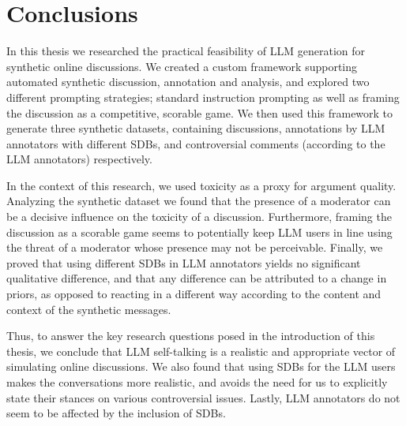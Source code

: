 %
\chapter{Conclusions}
\label{sec:conclusions}

In this thesis we researched the practical feasibility of LLM generation for synthetic online discussions. We created a custom framework supporting automated synthetic discussion, annotation and analysis, and explored two different prompting strategies; standard instruction prompting as well as framing the discussion as a competitive, scorable game. We then used this framework to generate three synthetic datasets, containing discussions, annotations by LLM annotators with different SDBs, and controversial comments (according to the LLM annotators) respectively. 

In the context of this research, we used toxicity as a proxy for argument quality. Analyzing the synthetic dataset we found that the presence of a moderator can be a decisive influence on the toxicity of a discussion. Furthermore, framing the discussion as a scorable game seems to potentially keep LLM users in line using the threat of a moderator whose presence may not be perceivable. Finally, we proved that using different SDBs in LLM annotators yields no significant qualitative difference, and that any difference can be attributed to a change in priors, as opposed to reacting in a different way according to the content and context of the synthetic messages.

Thus, to answer the key research questions posed in the introduction of this thesis, we conclude that LLM self-talking is a realistic and appropriate vector of simulating online discussions. We also found that using SDBs for the LLM users makes the conversations more realistic, and avoids the need for us to explicitly state their stances on various controversial issues. Lastly, LLM annotators do not seem to be affected by the inclusion of SDBs.


